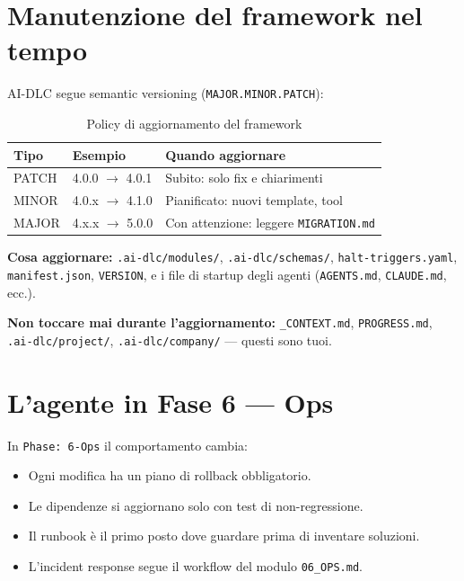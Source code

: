\section{Manutenzione del framework nel tempo}
\label{sec:16-manutenzione}

AI-DLC segue semantic versioning (\texttt{MAJOR.MINOR.PATCH}):

\begin{table}[htbp]
  \centering
  \begin{tabular}{lll}
    \toprule
    \textbf{Tipo} & \textbf{Esempio} & \textbf{Quando aggiornare} \\
    \midrule
    PATCH & 4.0.0 $\to$ 4.0.1 & Subito: solo fix e chiarimenti \\
    MINOR & 4.0.x $\to$ 4.1.0 & Pianificato: nuovi template, tool \\
    MAJOR & 4.x.x $\to$ 5.0.0 & Con attenzione: leggere \texttt{MIGRATION.md} \\
    \bottomrule
  \end{tabular}
  \caption{Policy di aggiornamento del framework}
  \label{tab:16-versioning}
\end{table}

\textbf{Cosa aggiornare:} \texttt{.ai-dlc/modules/}, \texttt{.ai-dlc/schemas/}, \texttt{halt-triggers.yaml}, \texttt{manifest.json}, \texttt{VERSION}, e i file di startup degli agenti (\texttt{AGENTS.md}, \texttt{CLAUDE.md}, ecc.).

\textbf{Non toccare mai durante l'aggiornamento:} \texttt{\_CONTEXT.md}, \texttt{PROGRESS.md}, \texttt{.ai-dlc/project/}, \texttt{.ai-dlc/company/} --- questi sono tuoi.

\section{L'agente in Fase 6 --- Ops}
\label{sec:16-ops}

In \texttt{Phase: 6-Ops} il comportamento cambia:
\begin{itemize}
  \item Ogni modifica ha un piano di rollback obbligatorio.
  \item Le dipendenze si aggiornano solo con test di non-regressione.
  \item Il runbook è il primo posto dove guardare prima di inventare soluzioni.
  \item L'incident response segue il workflow del modulo \texttt{06\_OPS.md}.
\end{itemize}

